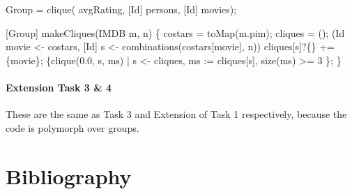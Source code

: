 \documentclass[submission,copyright,creativecommons]{eptcs}
\begin{document}
\begin{rascal}
 Group = clique( avgRating, [Id] persons, [Id] movies);
\end{rascal}


\begin{rascal}
[Group] makeCliques(IMDB m,  n) \{{}
    costars = toMap(m.pim); cliques = ();
     (Id movie \textless{}- costars, [Id] s \textless{}- combinations(costars{}[movie], n))
      cliques{}[s]?\{\} += \{{}movie\}{};
     \{{}clique(0.0, s, ms) | s \textless{}- cliques, ms := cliques{}[s], size(ms) \textgreater{}= 3 \}{};
\}{}
\end{rascal}

\paragraph{Extension Task 3 \& 4}

These are the same as Task 3 and Extension of Task 1 respectively,
because the code is polymorph over groups.

\section{Bibliography}

\nocite{*}


\end{document}
